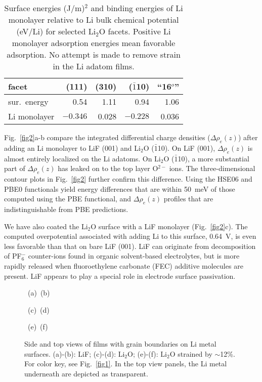 \documentclass[prb,preprint,amsmath,amssymb]{revtex4}
\begin{document}
\begin{table}\centering
\begin{tabular}{l|r|r|r|r} \hline
facet & (111) & (310) & ($\bar{1}$10) & ``16$^o$'' \\ \hline
sur.~energy & 0.54 & 1.11 &  0.94  & 1.06 \\
Li monolayer & $-0.346$ & 0.028 & $-0.228$ & 0.036 \\
\hline
\end{tabular}
\caption[]
{\label{table2} \noindent
Surface energies (J/m)$^2$ and binding energies of Li monolayer relative
to Li bulk chemical potential (eV/Li) for selected Li$_2$O facets.
Positive Li monolayer adsorption energies mean favorable adsorption.  No
attempt is made to remove strain in the Li adatom films.\cite{holzwarth}
}
\end{table}

Fig.~\ref{fig2}a-b compare the integrated differential charge densities
($\Delta \rho_e(z)$) after adding an Li monolayer to LiF (001) and
Li$_2$O ($\bar{1}$10).  On LiF (001), $\Delta \rho_e(z)$ is almost entirely
localized on the Li adatoms.  On Li$_2$O ($\bar{1}$10), a more substantial
part of $\Delta \rho_e(z)$ has leaked on to the top layer O$^{2-}$ ions.
The three-dimensional contour plots in Fig.~\ref{fig2} further confirm this
difference.  Using the HSE06 and PBE0 functionals yield energy differences
that are within 50~meV of those computed using the PBE functional, and
$\Delta \rho_e(z)$ profiles that are indistinguishable from PBE predictions.

We have also coated the Li$_2$O surface with a LiF monolayer
(Fig.~\ref{fig2}c). The computed overpotential associated with adding Li to
this surface, 0.64~V, is even less favorable than that on bare LiF (001).
LiF can originate from decomposition of PF$_6^-$ counter-ions found in organic
solvent-based electrolytes, but is more rapidly released when fluoroethylene
carbonate (FEC) additive molecules are present.\cite{fec1,fec2,fec3}
LiF appears to play a special role in electrode surface passivation.

\begin{figure}
\centerline{\hbox{ (a) \epsfxsize=2.20in  
		   \epsfxsize=2.20in  (b)}}
\centerline{\hbox{ (c) \epsfxsize=2.20in  
		   \epsfxsize=2.20in  (d)}}
\centerline{\hbox{ (e) \epsfxsize=2.20in  
		   \epsfxsize=2.20in  (f)}}
\caption[]
{\label{fig3} \noindent
Side and top views of films with grain boundaries on Li metal surfaces.
(a)-(b): LiF; (c)-(d): Li$_2$O; (e)-(f): Li$_2$O strained by $\sim$12\%.
For color key, see Fig.~\ref{fig1}.  In the top view panels, the
Li metal underneath are depicted as transparent.
}
\end{figure}
\end{document}
